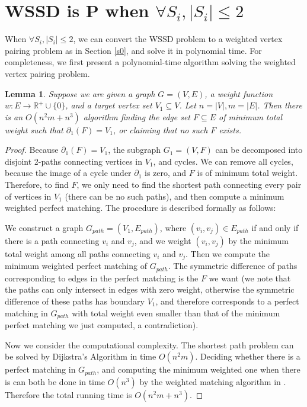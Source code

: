\documentclass[10pt,fleqn]{article}
\newtheorem{lemma}[theorem]{Lemma}
\newcommand{\R}{\mathbb{R}}
\begin{document}
	\section{WSSD is P when $\forall S_i,|S_i|\leq2$}\label{s5}
	When $\forall S_i,|S_i|\leq2$, we can convert the WSSD problem to a weighted vertex pairing problem as in Section \ref{s0}, and solve it in polynomial time. For completeness, we first present a polynomial-time algorithm solving the weighted vertex pairing problem.
	\begin{lemma}\label{lem51}
		Suppose we are given a graph $G=(V,E)$, a weight function $w:E\to\R^+\cup\{0\}$, and a target vertex set $V_1\subseteq V$. Let $n=|V|,m=|E|$. Then there is an $O(n^2m+n^3)$ algorithm finding the edge set $F\subseteq E$ of minimum total weight such that $\partial_1(F)=V_1$, or claiming that no such $F$ exists.
	\end{lemma}
	\begin{proof}
		Because $\partial_1(F)=V_1$, the subgraph $G_1=(V,F)$ can be decomposed into disjoint 2-paths connecting vertices in $V_1$, and cycles. We can remove all cycles, because the image of a cycle under $\partial_1$ is zero, and $F$ is of minimum total weight. Therefore, to find $F$, we only need to find the shortest path connecting every pair of vertices in $V_1$ (there can be no such paths), and then compute a minimum weighted perfect matching. The procedure is described formally as follows: \par
		We construct a graph $G_{path}=(V_1,E_{path})$, where $(v_i,v_j)\in E_{path}$ if and only if there is a path connecting $v_i$ and $v_j$, and we weight $(v_i,v_j)$ by the minimum total weight among all paths connecting $v_i$ and $v_j$. Then we compute the minimum weighted perfect matching of $G_{path}$. The symmetric difference of paths corresponding to edges in the perfect matching is the $F$ we want (we note that the paths can only intersect in edges with zero weight, otherwise the symmetric difference of these paths has boundary $V_1$, and therefore corresponds to a perfect matching in $G_{path}$ with total weight even smaller than that of the minimum perfect matching we just computed, a contradiction). \par
		Now we consider the computational complexity. The shortest path problem can be solved by Dijkstra's Algorithm in time $O(n^2m)$. Deciding whether there is a perfect matching in $G_{path}$, and computing the minimum weighted one when there is can both be done in time $O(n^3)$ by the weighted matching algorithm in \cite{110}. Therefore the total running time is $O(n^2m+n^3)$.
	\end{proof}
\end{document}
